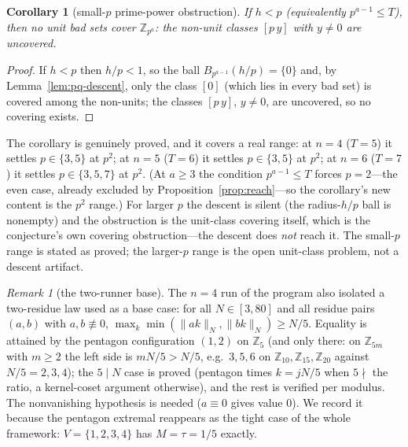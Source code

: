 \documentclass[11pt,a4paper]{article}
\numberwithin{equation}{section}
\theoremstyle{plain}
\newtheorem{corollary}[theorem]{Corollary}
\theoremstyle{definition}
\theoremstyle{remark}
\newtheorem{remark}[theorem]{Remark}
\newcommand{\Z}{\mathbb{Z}}
\newcommand{\wn}[1]{\lVert #1 \rVert_{N}}
\begin{document}
\begin{corollary}[small-$p$ prime-power obstruction]\label{cor:pq-small}
If $h<p$ (equivalently $p^{a-1}\le T$), then no unit bad sets cover
$\Z_{p^a}$: the non-unit classes $[p\,y]$ with $y\ne 0$ are uncovered.
\end{corollary}

\begin{proof}
If $h<p$ then $h/p<1$, so the ball $B_{p^{a-1}}(h/p)=\{0\}$ and, by
Lemma~\ref{lem:pq-descent}, only the class $[0]$ (which lies in every
bad set) is covered among the non-units; the classes $[p\,y]$, $y\ne0$,
are uncovered, so no covering exists.
\end{proof}

The corollary is genuinely proved, and it covers a real range: at
$n=4$ ($T=5$) it settles $p\in\{3,5\}$ at $p^2$; at $n=5$ ($T=6$) it
settles $p\in\{3,5\}$ at $p^2$; at $n=6$ ($T=7$) it settles
$p\in\{3,5,7\}$ at $p^2$. (At $a\ge3$ the condition $p^{a-1}\le T$ forces
$p=2$---the even case, already excluded by Proposition~\ref{prop:reach}---so
the corollary's new content is the $p^2$ range.) For larger $p$ the
descent is silent (the radius-$h/p$ ball is nonempty) and the obstruction
is the unit-class covering itself, which is the conjecture's own covering
obstruction---the descent does \emph{not} reach it. The small-$p$ range is
stated as proved; the larger-$p$ range is the open unit-class problem,
not a descent artifact.

\begin{remark}[the two-runner base]\label{rem:tworunner}
The $n=4$ run of the program also isolated a two-residue law used as a
base case: for all $N\in[3,80]$ and all residue pairs $(a,b)$ with
$a,b\not\equiv 0$,
$\max_k\min(\wn{ak},\wn{bk})\ge N/5$. Equality is attained by the
pentagon configuration $(1,2)$ on $\Z_5$ (and only there: on $\Z_{5m}$
with $m\ge 2$ the left side is $mN/5>N/5$, e.g.\ $3,5,6$ on
$\Z_{10},\Z_{15},\Z_{20}$ against $N/5=2,3,4$); the $5\mid N$ case is
proved (pentagon times $k=jN/5$ when $5\nmid$ the ratio, a kernel-coset
argument otherwise), and the rest is verified per modulus. The
nonvanishing hypothesis is needed ($a\equiv 0$ gives value $0$). We
record it because the pentagon extremal reappears as the tight case of
the whole framework: $V=\{1,2,3,4\}$ has $M=\tau=1/5$ exactly.
\end{remark}

\end{document}
